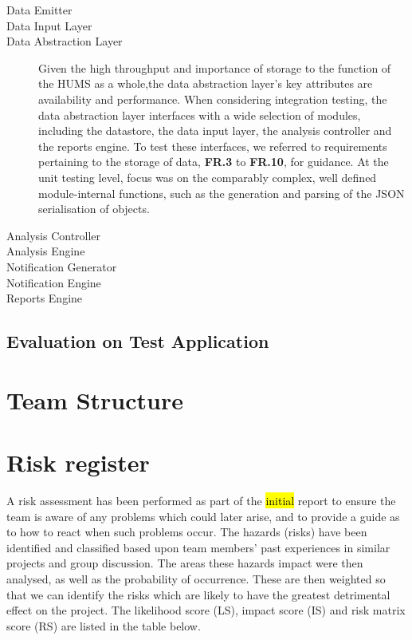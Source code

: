 \documentclass[10pt,a4paper]{article}
\begin{document}
\begin{description}
\item[Data Emitter]
\item[Data Input Layer]
\item[Data Abstraction Layer] %
Given the high throughput and importance of storage to the function of the HUMS as a whole,the data abstraction layer's key attributes are availability and performance. When considering integration testing, the data abstraction layer interfaces with a wide selection of modules, including the datastore, the data input layer, the analysis controller and the reports engine. To test these interfaces, we referred to requirements pertaining to the storage of data, \textbf{FR.3} to \textbf{FR.10}, for guidance. %
 At the unit testing level, focus was on the comparably complex, well defined module-internal functions, such as the generation and parsing of the JSON serialisation of objects.
\item[Analysis Controller]
\item[Analysis Engine]
\item[Notification Generator]
\item[Notification Engine]
\item[Reports Engine]
\end{description}

\subsection{Evaluation on Test Application}

\section{Team Structure}

\section{Risk register}
A risk assessment has been performed as part of the \hl{initial} report to ensure the team is aware of any problems which could later arise, and to provide a guide as to how to react when such problems occur. The hazards (risks) have been identified and classified based upon team members' past experiences in similar projects and group discussion. The areas these hazards impact were then analysed, as well as the probability of occurrence. These are then weighted so that we can identify the risks which are likely to have the greatest detrimental effect on the project. The likelihood score (LS), impact score (IS) and risk matrix score (RS) are listed in the table below.
\end{document}
